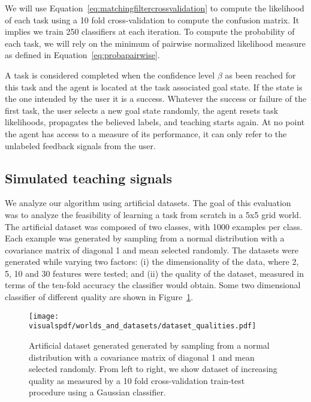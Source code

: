 We will use Equation~\ref{eq:matchingfiltercrossvalidation} to compute the likelihood of each task using a 10 fold cross-validation to compute the confusion matrix. It implies we train 250 classifiers at each iteration. To compute the probability of each task, we will rely on the minimum of pairwise normalized likelihood measure as defined in Equation~\ref{eq:probapairwise}.

A task is considered completed when the confidence level $\beta$ as been reached for this task and the agent is located at the task associated goal state. If the state is the one intended by the user it is a success. Whatever the success or failure of the first task, the user selects a new goal state randomly, the agent resets task likelihoods, propagates the believed labels, and teaching starts again. At no point the agent has access to a measure of its performance, it can only refer to the unlabeled feedback signals from the user.

\subsection{Simulated teaching signals}
\label{chapter:planning:artificialsignals}

We analyze our algorithm using artificial datasets. The goal of this evaluation was to analyze the feasibility of learning a task from scratch in a 5x5 grid world. The artificial dataset was composed of two classes, with 1000 examples per class. Each example was generated by sampling from a normal distribution with a covariance matrix of diagonal 1 and mean selected randomly. The datasets were generated while varying two factors: (i) the dimensionality of the data, where 2, 5, 10 and 30 features were tested; and (ii) the quality of the dataset, measured in terms of the ten-fold accuracy the classifier would obtain. Some two dimensional classifier of different quality are shown in Figure~\ref{fig:datasetsquality}.

\begin{figure}[!htbp]
  \centering
      \texttt{[image: \\visualspdf/worlds\_and\_datasets/dataset\_qualities.pdf]}
      \caption{Artificial dataset generated generated by sampling from a normal distribution with a covariance matrix of diagonal 1 and mean selected randomly. From left to right, we show dataset of increasing quality as measured by a 10 fold cross-validation train-test procedure using a Gaussian classifier.}
    \label{fig:datasetsquality}
\end{figure}


